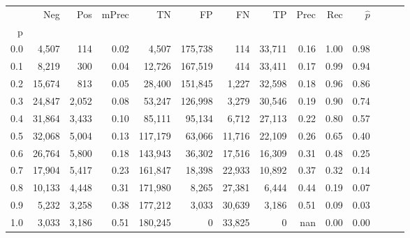 \begin{tabular}{rrrrrrrrrrrrrr}
\toprule
{} &     Neg &    Pos & mPrec &       TN &       FP &      FN &      TP &  Prec &   Rec & $\hat{p}$ \\
p   &         &        &       &          &          &         &         &       &       &           \\
\midrule
0.0 &   4,507 &    114 &  0.02 &    4,507 &  175,738 &     114 &  33,711 &  0.16 &  1.00 &      0.98 \\
0.1 &   8,219 &    300 &  0.04 &   12,726 &  167,519 &     414 &  33,411 &  0.17 &  0.99 &      0.94 \\
0.2 &  15,674 &    813 &  0.05 &   28,400 &  151,845 &   1,227 &  32,598 &  0.18 &  0.96 &      0.86 \\
0.3 &  24,847 &  2,052 &  0.08 &   53,247 &  126,998 &   3,279 &  30,546 &  0.19 &  0.90 &      0.74 \\
0.4 &  31,864 &  3,433 &  0.10 &   85,111 &   95,134 &   6,712 &  27,113 &  0.22 &  0.80 &      0.57 \\
0.5 &  32,068 &  5,004 &  0.13 &  117,179 &   63,066 &  11,716 &  22,109 &  0.26 &  0.65 &      0.40 \\
0.6 &  26,764 &  5,800 &  0.18 &  143,943 &   36,302 &  17,516 &  16,309 &  0.31 &  0.48 &      0.25 \\
0.7 &  17,904 &  5,417 &  0.23 &  161,847 &   18,398 &  22,933 &  10,892 &  0.37 &  0.32 &      0.14 \\
0.8 &  10,133 &  4,448 &  0.31 &  171,980 &    8,265 &  27,381 &   6,444 &  0.44 &  0.19 &      0.07 \\
0.9 &   5,232 &  3,258 &  0.38 &  177,212 &    3,033 &  30,639 &   3,186 &  0.51 &  0.09 &      0.03 \\
1.0 &   3,033 &  3,186 &  0.51 &  180,245 &        0 &  33,825 &       0 &   nan &  0.00 &      0.00 \\
\bottomrule
\end{tabular}
